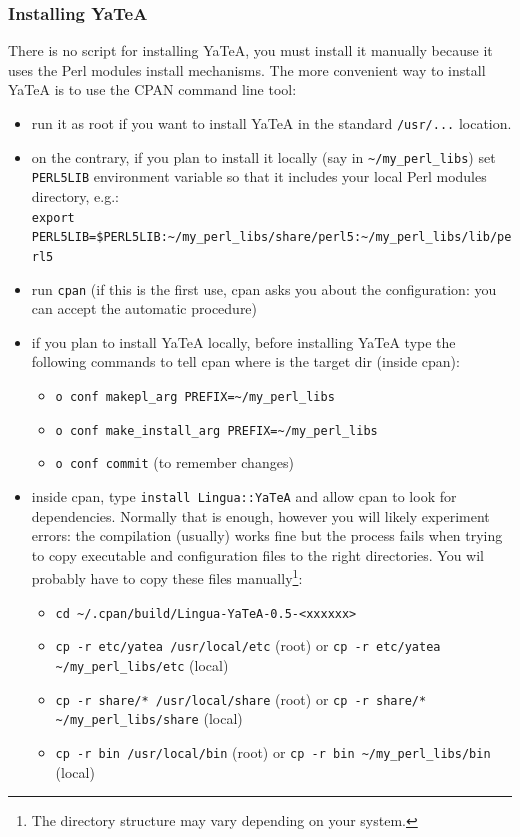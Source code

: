 \documentclass{article}
\newenvironment{xitemize}{
\begin{itemize}
  \setlength{\itemsep}{.3\baselineskip}
  \setlength{\topsep}{0pt}
  \setlength{\parskip}{0pt}
  \setlength{\parsep}{0pt}
}{\end{itemize}}
\begin{document}
\subsubsection{Installing YaTeA}

\label{partInstallYatea}
There is no script for installing YaTeA, you must install it manually because it uses the Perl modules install mechanisms. The more convenient way to install YaTeA is to use the CPAN command line tool:

\begin{xitemize} 
\item run it as root if you want to install YaTeA in the standard {\tt /usr/...} location. 
\item on the contrary, if you plan to install it locally (say in {\tt \textasciitilde/my\_perl\_libs}) set {\tt PERL5LIB} environment variable so that it includes your local Perl modules directory, e.g.:\\ {\tt export PERL5LIB=\$PERL5LIB:\textasciitilde/my\_perl\_libs/share/perl5:\textasciitilde/my\_perl\_libs/lib/perl5} 
\item run {\tt cpan} (if this is the first use, cpan asks you about the configuration: you can accept the automatic procedure)
\item if you plan to install YaTeA locally, before installing YaTeA type the following commands to tell cpan where is the target dir (inside cpan):
\begin{xitemize}
\item  {\tt o conf makepl\_arg PREFIX=\textasciitilde/my\_perl\_libs}  
\item  {\tt o conf make\_install\_arg PREFIX=\textasciitilde/my\_perl\_libs}  
\item  {\tt o conf commit}  (to remember changes)
\end{xitemize}
\item  inside cpan, type {\tt install Lingua::YaTeA} and allow cpan to look for dependencies. Normally that is enough, however you will likely experiment errors: the compilation (usually) works fine but the process fails when trying to copy executable and configuration files to the right directories. You wil probably have to copy these files manually\footnote{The directory structure may vary depending on your system.}:
\begin{xitemize}
\item {\tt cd \textasciitilde/.cpan/build/Lingua-YaTeA-0.5-<xxxxxx>}
\item {\tt cp -r etc/yatea /usr/local/etc} (root) or {\tt cp -r etc/yatea \textasciitilde/my\_perl\_libs/etc} (local)
\item {\tt cp -r share/* /usr/local/share} (root) or {\tt cp -r share/* \textasciitilde/my\_perl\_libs/share} (local)
\item {\tt cp -r bin /usr/local/bin} (root) or {\tt cp -r bin \textasciitilde/my\_perl\_libs/bin} (local)
\end{xitemize}

\end{xitemize}
\end{document}
